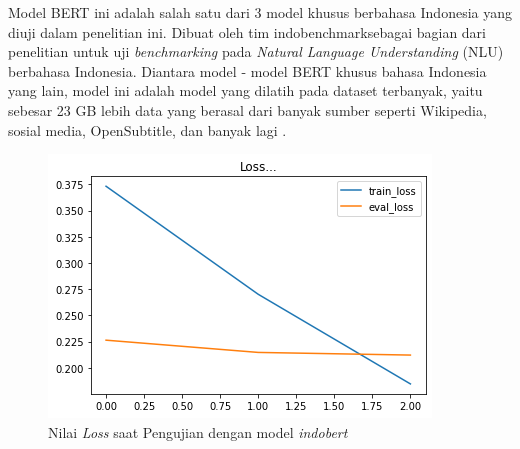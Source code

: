 Model BERT ini adalah salah satu dari 3 model khusus berbahasa Indonesia yang diuji dalam penelitian ini. Dibuat oleh tim indobenchmarksebagai bagian dari penelitian untuk uji \textit{benchmarking} pada \textit{Natural Language Understanding} (NLU) berbahasa Indonesia. Diantara model - model BERT khusus bahasa Indonesia yang lain, model ini adalah model yang dilatih pada dataset terbanyak, yaitu sebesar 23 GB lebih data yang berasal dari banyak sumber seperti Wikipedia, sosial media, OpenSubtitle, dan banyak lagi \cite{koto2020indolem}.

\begin{figure}[h]
    \begin{center}
        \includegraphics[width= 0.9\linewidth]{gambar/loss_concat_awal.png}
        \caption{Nilai \textit{Loss} saat Pengujian dengan model \textit{indobert}}
        \label{fig: loss_bert_indobert}
    \end{center}
\end{figure}

